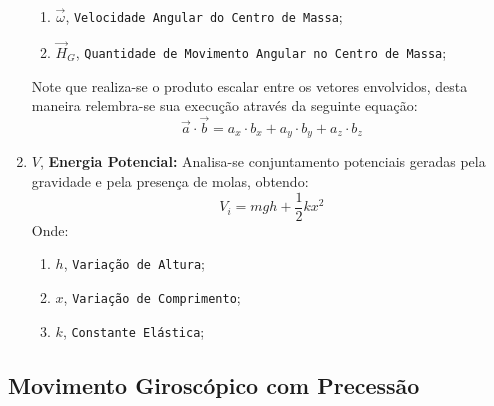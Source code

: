 \documentclass{article}
\begin{document}
\begin{enumerate}[rightmargin = \leftmargin]
\begin{enumerate}[rightmargin = \leftmargin, noitemsep]
                            \item $\vec{\omega}$, \texttt{Velocidade Angular do Centro de Massa};

                            \item $\vec{H}_{G}$, \texttt{Quantidade de Movimento Angular no Centro de Massa};
                        \end{enumerate}
                    Note que realiza-se o produto escalar entre os vetores envolvidos, desta maneira relembra-se sua execução através da seguinte equação:
                        \begin{equation}
                            \boxed{
                                \vec{a} \cdot \vec{b} = 
                                a_{x} \cdot b_{x} + 
                                a_{y} \cdot b_{y} + 
                                a_{z} \cdot b_{z}
                            }
                        \end{equation}

                    \item $V$, \textbf{Energia Potencial:} Analisa-se conjuntamento potenciais geradas pela gravidade e pela presença de molas, obtendo:
                        \begin{equation}
                            \boxed{
                                V_{i} = 
                                m g h +
                                \frac{1}{2} k x^{2} 
                            }
                        \end{equation}
                    Onde:
                        \begin{enumerate}[rightmargin = \leftmargin, noitemsep]
                            \item $h$, \texttt{Variação de Altura};
                            \item $x$, \texttt{Variação de Comprimento};
                            \item $k$, \texttt{Constante Elástica};
                        \end{enumerate}
                \end{enumerate}
\newpage

        \subsection{Movimento Giroscópico com Precessão}
\end{document}
